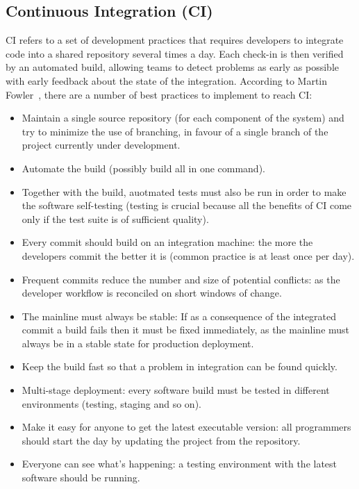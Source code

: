 \documentclass[a4paper]{spie}  %
\begin{document}
\subsection{Continuous Integration (CI)}
CI refers to a set of development practices that requires developers to integrate code into a shared repository several times a day. Each check-in is then verified by an automated build, allowing teams to detect problems as early as possible with early feedback about the state of the integration.
According to Martin Fowler~\cite{CI}, there are a number of best practices to implement to reach CI:
\begin{itemize}
    \item Maintain a single source repository (for each component of the system) and try to minimize the use of branching, in favour of a single branch of the project currently under development.
    \item Automate the build (possibly build all in one command).
    \item Together with the build, auotmated tests must also be run in order to make the software self-testing (testing is crucial because all the benefits of CI come only if the test suite is of sufficient quality).
    \item Every commit should build on an integration machine: the more the developers commit the better it is (common practice is at least once per day).
    \item Frequent commits reduce the number and size of potential conflicts: as the developer workflow is reconciled on short windows of change.
    \item The mainline must always be stable: If as a consequence of the integrated commit a build fails then it must be fixed immediately, as the mainline must always be in a stable state for production deployment.
    \item Keep the build fast so that a problem in integration can be found quickly.
    \item Multi-stage deployment: every software build must be tested in different environments (testing, staging and so on).
    \item Make it easy for anyone to get the latest executable version: all programmers should start the day by updating the project from the repository.
    \item Everyone can see what’s happening: a testing environment with the latest software should be running.
\end{itemize}
\end{document}
